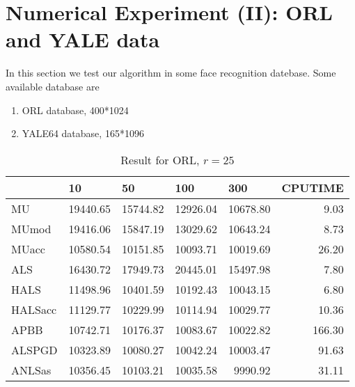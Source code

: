 \documentclass{article}
\begin{document}
\section{Numerical Experiment (II): ORL and YALE data}
In this section we test our algorithm in some face recognition datebase. Some available database are
\begin{enumerate}
	\item ORL database, 400*1024
	\item YALE64 database, 165*1096
\end{enumerate} 
\begin{table}[H]
	\caption{Result for ORL, $r = 25$}
	\centering
	\begin{tabular}{|l|r|r|r|r|r|}
		\hline
		& \multicolumn{1}{l|}{10} & \multicolumn{1}{l|}{50} & \multicolumn{1}{l|}{100} & \multicolumn{1}{l|}{300} & \multicolumn{1}{l|}{CPUTIME} \\ \hline
		MU       & 19440.65                & 15744.82                & 12926.04                 & 10678.80                 & 9.03                         \\ \hline
		MUmod    & 19416.06                & 15847.19                & 13029.62                 & 10643.24                 & 8.73                         \\ \hline
		MUacc    & 10580.54                & 10151.85                & 10093.71                 & 10019.69                 & 26.20                        \\ \hline
		ALS      & 16430.72                & 17949.73                & 20445.01                 & 15497.98                 & 7.80                         \\ \hline
		HALS     & 11498.96                & 10401.59                & 10192.43                 & 10043.15                 & 6.80                         \\ \hline
		HALSacc  & 11129.77                & 10229.99                & 10114.94                 & 10029.77                 & 10.36                        \\ \hline
		APBB     & 10742.71                & 10176.37                & 10083.67                 & 10022.82                 & 166.30                       \\ \hline
		ALSPGD   & 10323.89                & 10080.27                & 10042.24                 & 10003.47                 & 91.63                        \\ \hline
		ANLSas   & 10356.45                & 10103.21                & 10035.58                 & 9990.92                  & 31.11                        \\ \hline

\end{tabular}
\end{table}
\end{document}
